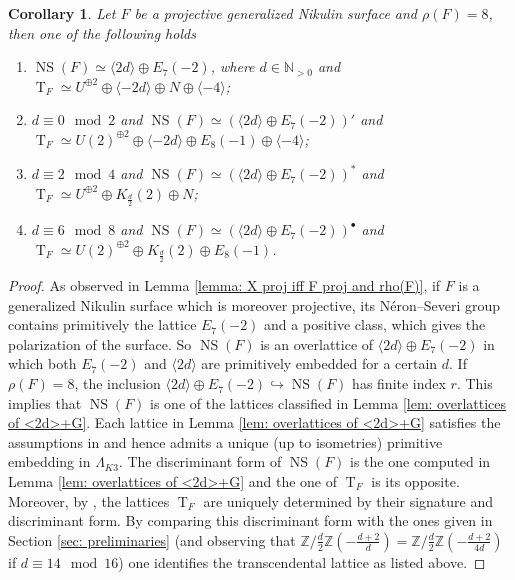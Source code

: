\documentclass{amsart}
\newtheorem{corollary}[thm]{Corollary}
\theoremstyle{definition}
\numberwithin{equation}{section}
\numberwithin{equation}{section} \theoremstyle{definition}
\DeclareMathOperator{\NS}{NS}
\DeclareMathOperator{\T}{T}
\newcommand\Z{\mathbb{Z}}
\begin{document}
\begin{corollary}\label{prop: Ns e T of projective F}
Let $F$ be a projective generalized Nikulin surface and $\rho(F)=8$, then one of the following holds
\begin{enumerate}
\item $\NS(F)\simeq \langle 2d\rangle\oplus E_7(-2)$, where $d\in\mathbb{N}_{>0}$ and $\T_F\simeq U^{\oplus 2}\oplus\langle -2d\rangle\oplus N\oplus \langle -4\rangle$;
\item $d\equiv 0\mod 2$ and $\NS(F)\simeq (\langle 2d\rangle\oplus E_7(-2))'$ and $\T_F\simeq  U(2)^{\oplus 2}\oplus\langle -2d\rangle\oplus E_8(-1)\oplus \langle -4\rangle$;
\item $d\equiv 2\mod 4$ and $\NS(F)\simeq (\langle 2d\rangle\oplus E_7(-2))^*$ and 
$\T_F\simeq U^{\oplus 2}\oplus K_{\frac{d}{2}}(2)\oplus N$;
\item $d\equiv 6\mod 8$ and $\NS(F)\simeq (\langle 2d\rangle\oplus E_7(-2))^{\bullet}$ and $\T_F\simeq U(2)^{\oplus 2}\oplus K_{\frac{d}{2}}(2)\oplus E_8(-1)$.
\end{enumerate}
\end{corollary}
\begin{proof}
As observed in Lemma \ref{lemma: X proj iff F proj and rho(F)}, if $F$ is a generalized Nikulin surface which is moreover projective, its N\'eron--Severi group contains primitively the lattice $E_7(-2)$ and a positive class, which gives the polarization of the surface. So $\NS(F)$ is an overlattice of $\langle 2d\rangle\oplus E_7(-2)$ in which both $E_7(-2)$ and $\langle 2d\rangle$ are primitively embedded for a certain $d$. If $\rho(F)=8$, the inclusion $\langle 2d\rangle\oplus E_7(-2)\hookrightarrow \NS(F)$ has finite index $r$. This implies that $\NS(F)$ is one of the lattices classified in Lemma \ref{lem: overlattices of <2d>+G}.
Each lattice in Lemma \ref{lem: overlattices of <2d>+G} satisfies the assumptions in \cite[Theorem 1.14.4]{N} and hence admits a unique (up to isometries) primitive embedding in $\Lambda_{K3}$. The discriminant form of $\NS(F)$ is the one computed in Lemma \ref{lem: overlattices of <2d>+G} and the one of $\T_F$ is its opposite. Moreover, by \cite[Corollary 1.13.3]{N}, the lattices $\T_F$ are uniquely determined by their signature and discriminant form. By comparing this discriminant form with the ones given in Section \ref{sec: preliminaries} (and observing that 
$\Z/{\frac{d}{2}}\Z\left(-\frac{d+2}{d}\right)=\Z/{\frac{d}{2}}\Z\left(-\frac{d+2}{4d}\right)$ if $d\equiv 14\mod 16$) one identifies the transcendental lattice as listed above. \end{proof}
\end{document}
